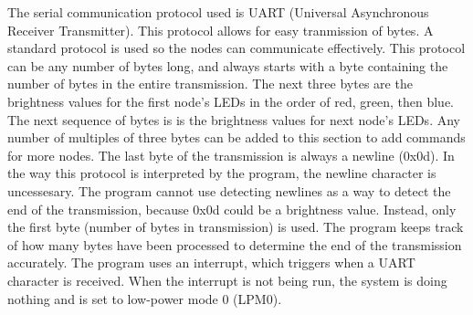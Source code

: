 
The serial communication protocol used is UART (Universal Asynchronous Receiver Transmitter). This protocol allows for easy tranmission of bytes. A standard protocol is used so the nodes can communicate effectively. This protocol can be any number of bytes long, and always starts with a byte containing the number of bytes in the entire transmission. The next three bytes are the brightness values for the first node's LEDs in the order of red, green, then blue. The next sequence of bytes is is the brightness values for next node's LEDs. Any number of multiples of three bytes can be added to this section to add commands for more nodes. The last byte of the transmission is always a newline (0x0d). In the way this protocol is interpreted by the program, the newline character is uncessesary. The program cannot use detecting newlines as a way to detect the end of the transmission, because 0x0d could be a brightness value. Instead, only the first byte (number of bytes in transmission) is used. The program keeps track of how many bytes have been processed to determine the end of the transmission accurately. The program uses an interrupt, which triggers when a UART character is received. When the interrupt is not being run, the system is doing nothing and is set to low-power mode 0 (LPM0).

